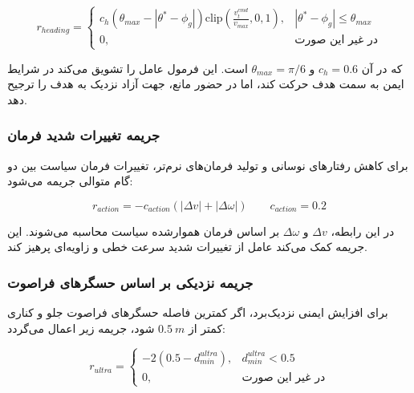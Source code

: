 \begin{equation}
	r_{heading}=
	\begin{cases}
		c_h\left(\theta_{max}-|\theta^*-\phi_g|\right)
		\mathrm{clip}\left(\frac{v^{cmd}_t}{v_{max}},0,1\right),
		& |\theta^*-\phi_g|\le\theta_{max}\\
		0, & \text{در غیر این صورت}
	\end{cases}
	\label{eq:adaptive_heading_reward_final}
\end{equation}

که در آن \(c_h=0.6\) و \(\theta_{max}=\pi/6\) است. این فرمول عامل را تشویق می‌کند در شرایط ایمن به سمت هدف حرکت کند، اما در حضور مانع، جهت آزاد نزدیک به هدف را ترجیح دهد.

\subsubsection{جریمه تغییرات شدید فرمان}
\label{subsubsec:action_smooth_reward_final}

برای کاهش رفتارهای نوسانی و تولید فرمان‌های نرم‌تر، تغییرات فرمان سیاست بین دو گام متوالی جریمه می‌شود:

\begin{equation}
	r_{action} = -c_{action}\left(|\Delta v|+|\Delta\omega|\right)
	\qquad
	c_{action}=0.2
	\label{eq:action_change_penalty_final}
\end{equation}

در این رابطه، \(\Delta v\) و \(\Delta\omega\) بر اساس فرمان هموارشده سیاست محاسبه می‌شوند. این جریمه کمک می‌کند عامل از تغییرات شدید سرعت خطی و زاویه‌ای پرهیز کند.

\subsubsection{جریمه نزدیکی بر اساس حسگرهای فراصوت}
\label{subsubsec:ultrasonic_reward_final}

برای افزایش ایمنی نزدیک‌برد، اگر کمترین فاصله حسگرهای فراصوت جلو و کناری کمتر از \(0.5~m\) شود، جریمه زیر اعمال می‌گردد:

\begin{equation}
	r_{ultra}=
	\begin{cases}
		-2(0.5-d_{min}^{ultra}), & d_{min}^{ultra}<0.5\\
		0, & \text{در غیر این صورت}
	\end{cases}
	\label{eq:ultra_reward_final}
\end{equation}

